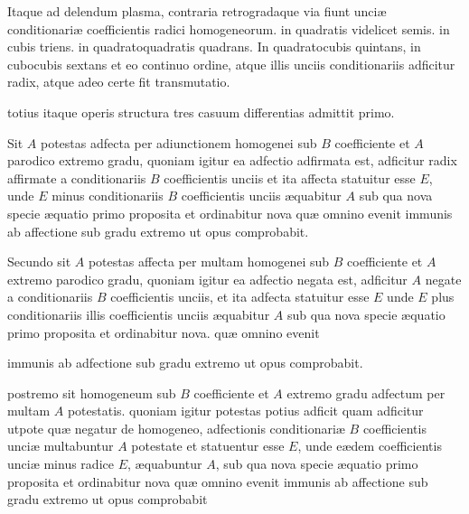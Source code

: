 \documentclass[11pt,a4paper]{article}
\begin{document}
Itaque ad delendum plasma, contraria retrogradaque via fiunt unciæ conditionariæ coefficientis radici homogeneorum. in quadratis videlicet semis. in cubis triens. in quadratoquadratis quadrans. In quadratocubis quintans, in cubocubis sextans et eo continuo ordine, atque illis unciis conditionariis adficitur radix, atque adeo certe fit transmutatio.

totius itaque operis structura tres casuum differentias admittit primo.

Sit $A$ potestas adfecta per adiunctionem homogenei sub $B$ coefficiente et $A$ parodico extremo gradu, quoniam igitur ea adfectio adfirmata est, adficitur radix affirmate a conditionariis $B$ coefficientis unciis et ita affecta statuitur esse $E$, unde $E$ minus conditionariis $B$ coefficientis unciis æquabitur $A$ sub qua nova specie æquatio primo proposita  et ordinabitur nova quæ omnino evenit immunis ab affectione sub gradu extremo ut opus comprobabit.

Secundo sit $A$ potestas affecta per multam homogenei sub $B$ coefficiente et $A$ extremo parodico gradu, quoniam igitur ea adfectio negata est, adficitur $A$ negate a conditionariis $B$ coefficientis unciis, et ita adfecta statuitur esse $E$ unde $E$ plus conditionariis illis \struck{\ill{}} coefficientis unciis æquabitur $A$ sub qua nova specie æquatio primo proposita  et ordinabitur nova. quæ omnino evenit 


immunis ab adfectione sub gradu extremo ut opus comprobabit.

postremo sit homogeneum sub $B$ coefficiente et $A$ extremo gradu adfectum per multam $A$ potestatis. quoniam igitur potestas potius adficit quam adficitur utpote quæ negatur de homogeneo, adfectionis conditionariæ $B$ coefficientis unciæ multabuntur $A$ potestate et statuentur esse $E$, unde eædem coefficientis unciæ minus radice $E$, æquabuntur $A$, sub qua nova specie æquatio primo proposita  et ordinabitur nova quæ omnino evenit immunis ab affectione sub gradu extremo ut opus comprobabit
\end{document}
